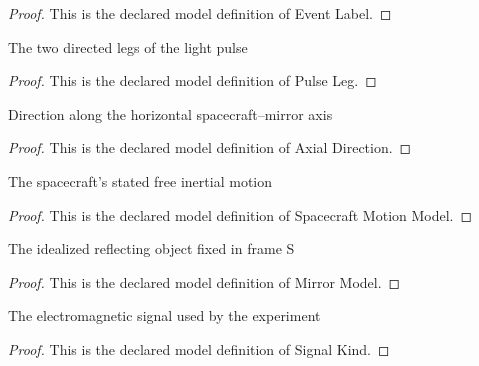 \begin{proof}
  This is the declared model definition of Event Label.
\end{proof}
\begin{definition}
  \label{def:physics:phyx-mini-0528:phyxminiproblems-problemphyxmini0528-pulseleg}
  The two directed legs of the light pulse
\end{definition}
\begin{proof}
  This is the declared model definition of Pulse Leg.
\end{proof}
\begin{definition}
  \label{def:physics:phyx-mini-0528:phyxminiproblems-problemphyxmini0528-axialdirection}
  Direction along the horizontal spacecraft--mirror axis
\end{definition}
\begin{proof}
  This is the declared model definition of Axial Direction.
\end{proof}
\begin{definition}
  \label{def:physics:phyx-mini-0528:phyxminiproblems-problemphyxmini0528-spacecraftmotionmodel}
  The spacecraft's stated free inertial motion
\end{definition}
\begin{proof}
  This is the declared model definition of Spacecraft Motion Model.
\end{proof}
\begin{definition}
  \label{def:physics:phyx-mini-0528:phyxminiproblems-problemphyxmini0528-mirrormodel}
  The idealized reflecting object fixed in frame S
\end{definition}
\begin{proof}
  This is the declared model definition of Mirror Model.
\end{proof}
\begin{definition}
  \label{def:physics:phyx-mini-0528:phyxminiproblems-problemphyxmini0528-signalkind}
  The electromagnetic signal used by the experiment
\end{definition}
\begin{proof}
  This is the declared model definition of Signal Kind.
\end{proof}

